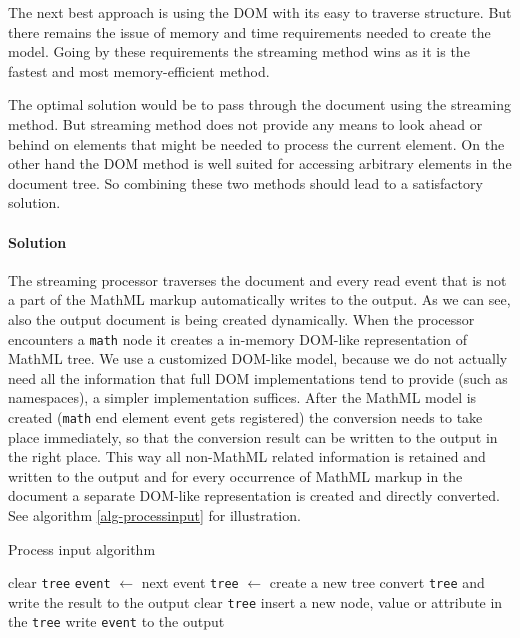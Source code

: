 \documentclass[11pt,oneside,final]{fithesis2}
\begin{document}
The next best approach is using the DOM with its easy to traverse structure. But there remains the issue of memory and time requirements needed to create the model. Going by these requirements the streaming method wins as it is the fastest and most memory-efficient method.

The optimal solution would be to pass through the document using the streaming method. But streaming method does not provide any means to look ahead or behind on elements that might be needed to process the current element. On the other hand the DOM method is well suited for accessing arbitrary elements in the document tree. So combining these two methods should lead to a satisfactory solution. 

\paragraph*{Solution}\label{inputprocessing:solution} The streaming processor traverses the document and every read event that is not a part of the MathML markup automatically writes to the output. As we can see, also the output document is being created dynamically. When the processor encounters a \texttt{math} node it creates a in-memory DOM-like representation of MathML tree. We use a customized DOM-like model, because we do not actually need all the information that full DOM implementations tend to provide (such as namespaces), a simpler implementation suffices. After the MathML model is created (\texttt{math} end element event gets registered) the conversion needs to take place immediately, so that the conversion result can be written to the output in the right place. This way all non-MathML related information is retained and written to the output and for every occurrence of MathML markup in the document a separate DOM-like representation is created and directly converted. See algorithm \ref{alg-processinput} for illustration. 
\fi

\begin{algorithm}[!ht]
\caption{Process input algorithm}
\label{alg-processinput}
\begin{algorithmic}[1]
	\State clear \texttt{tree}
		\State \texttt{event} $\gets$ next event
			\State \texttt{tree} $\gets$ create a new tree
			\State convert \texttt{tree} and write the result to the output
			\State clear \texttt{tree}			
			\State insert a new node, value or attribute in the \texttt{tree}
		\Else
			\State write \texttt{event} to the output
		\EndIf
	\EndWhile
\EndProcedure
\end{algorithmic}
\end{algorithm}
\end{document}
